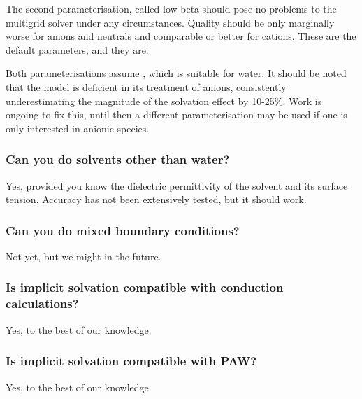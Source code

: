 \documentclass[letterpaper,10pt,english]{sphinxmanual}
\begin{document}
The second parameterisation, called low-beta should pose no problems to
the multigrid solver under any circumstances. Quality should be only
marginally worse for anions and neutrals and comparable or better for
cations. These are the default parameters, and they are:

\begin{DUlineblock}{0em}
\item[] 
\item[] 
\end{DUlineblock}

Both parameterisations assume , which is
suitable for water. It should be noted that the model is deficient in
its treatment of anions, consistently underestimating the magnitude of
the solvation effect by 10-25\%. Work is ongoing to fix this, until then
a different parameterisation may be used if one is only interested in
anionic species.


\subsubsection{Can you do solvents other than water?}
\label{\detokenize{implicit_solvation_v3:can-you-do-solvents-other-than-water}}
Yes, provided you know the dielectric permittivity of the solvent and
its surface tension. Accuracy has not been extensively tested, but it
should work.


\subsubsection{Can you do mixed boundary conditions?}
\label{\detokenize{implicit_solvation_v3:can-you-do-mixed-boundary-conditions}}
Not yet, but we might in the future.


\subsubsection{Is implicit solvation compatible with conduction calculations?}
\label{\detokenize{implicit_solvation_v3:is-implicit-solvation-compatible-with-conduction-calculations}}
Yes, to the best of our knowledge.


\subsubsection{Is implicit solvation compatible with PAW?}
\label{\detokenize{implicit_solvation_v3:is-implicit-solvation-compatible-with-paw}}
Yes, to the best of our knowledge.
\end{document}

